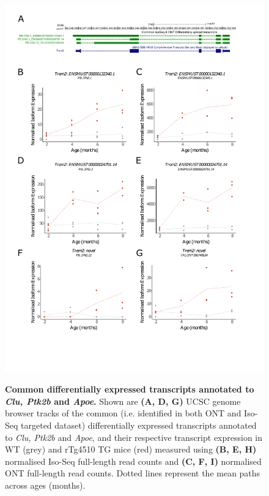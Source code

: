 \begin{figure}[htp]
	\centering
	\includegraphics[page=2,trim={0 0cm 0 0},scale =0.75]{Figures/DiffCommon.pdf}
	\captionsetup{width=0.95\textwidth}
	\label{fig:diffcommon_2}
	\caption[Common differentially expressed transcripts annotated to \textit{Clu, Ptk2b} and \textit{Apoe}]%
	{\textbf{Common differentially expressed transcripts annotated to \textit{Clu, Ptk2b} and \textit{Apoe}.} Shown are \textbf{(A, D, G)} UCSC genome browser tracks of the common (i.e. identified in both ONT and Iso-Seq targeted dataset) differentially expressed transcripts annotated to \textit{Clu, Ptk2b} and \textit{Apoe}, and their respective transcript expression in WT (grey) and rTg4510 TG mice (red) measured using \textbf{(B, E, H)} normalised Iso-Seq full-length read counts and \textbf{(C, F, I)} normalised ONT full-length read counts. Dotted lines represent the mean paths across ages (months).}   
\end{figure}

